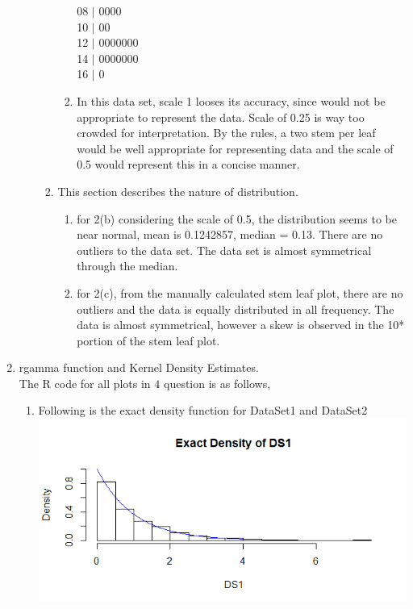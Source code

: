 \documentclass{article}
\begin{document}
\begin{enumerate}
\begin{enumerate}
\begin{enumerate}
\begin{enumerate}
  08 $|$ 0000\\
  10 $|$ 00\\
  12 $|$ 0000000\\
  14 $|$ 0000000\\
  16 $|$ 0\\
\item In this data set, scale 1 looses its accuracy, since would not be appropriate to represent the data.
Scale of 0.25 is way too crowded for interpretation. By the rules, a two stem per leaf would be well appropriate for representing data and the scale of 0.5 would represent this in a concise manner.
\end{enumerate}
\item This section describes the nature of distribution.
\begin{enumerate}
\item for 2(b) considering the scale of 0.5, the distribution seems to be near normal, mean is 0.1242857, median = 0.13. There are no outliers to the data set. The data set is almost symmetrical through the median.
\item for 2(c), from the manually calculated stem leaf plot, there are no outliers and the data is equally distributed in all frequency. The data is almost symmetrical, however a skew is observed in the 10* portion of the stem leaf plot.
\end{enumerate}
\end{enumerate}
\end{enumerate}
\item rgamma function and Kernel Density Estimates.\\The R code for all plots in $4$ question is as follows,

\begin{enumerate}
\item Following is the exact density function for DataSet1 and DataSet2\\
\includegraphics[scale=0.5]{curve1}

\end{enumerate}
\end{enumerate}
\end{document}
